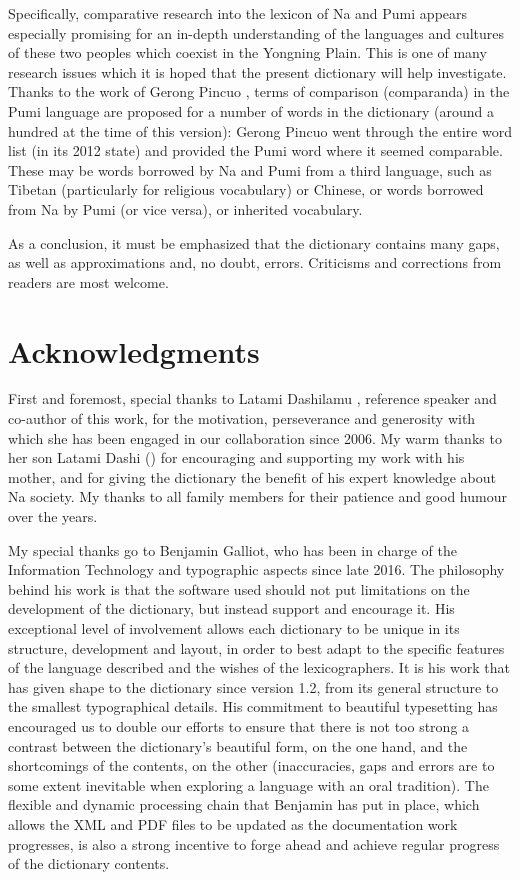 Specifically, comparative research into the lexicon of Na and Pumi \parencite{daudey2014} appears especially promising for an in-depth understanding of the languages and cultures of these two peoples which coexist in the Yongning Plain. This is one of many research issues which it is hoped that the present dictionary will help investigate. Thanks to the work of Gerong Pincuo , terms of comparison (comparanda) in the Pumi language are proposed for a number of words in the dictionary (around a hundred at the time of this version): Gerong Pincuo went through the entire word list (in its 2012 state) and provided the Pumi word where it seemed comparable. These may be words borrowed by Na and Pumi from a third language, such as Tibetan (particularly for religious vocabulary) or Chinese, or words borrowed from Na by Pumi (or vice versa), or inherited vocabulary.

As a conclusion, it must be emphasized that the dictionary contains many gaps, as well as approximations and, no doubt, errors. Criticisms and corrections from readers are most welcome.

\section*{Acknowledgments}

First and foremost, special thanks to Latami Dashilamu , reference speaker and co-author of this work, for the motivation, perseverance and generosity with which she has been engaged in our collaboration since 2006. My warm thanks to her son Latami Dashi  () for encouraging and supporting my work with his mother, and for giving the dictionary the benefit of his expert knowledge about Na society. My thanks to all family members for their patience and good humour over the years.

My special thanks go to Benjamin Galliot, who has been in charge of the Information Technology and typographic aspects since late 2016. The philosophy behind his work is that the software used should not put limitations on the development of the dictionary, but instead support and encourage it. His exceptional level of involvement allows each dictionary to be unique in its structure, development and layout, in order to best adapt to the specific features of the language described and the wishes of the lexicographers. It is his work that has given shape to the dictionary since version 1.2, from its general structure to the smallest typographical details. His commitment to beautiful typesetting has encouraged us to double our efforts to ensure that there is not too strong a contrast between the dictionary's beautiful form, on the one hand, and the shortcomings of the contents, on the other (inaccuracies, gaps and errors are to some extent inevitable when exploring a language with an oral tradition). The flexible and dynamic processing chain that Benjamin has put in place, which allows the XML and PDF files to be updated as the documentation work progresses, is also a strong incentive to forge ahead and achieve regular progress of the dictionary contents.

